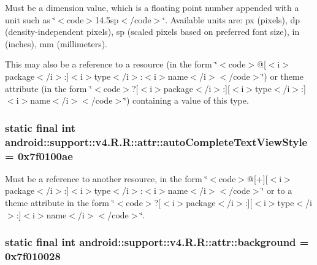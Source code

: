Must be a dimension value, which is a floating point number appended with a unit such as \char`\"{}$<$code$>$14.5sp$<$/code$>$\char`\"{}. Available units are: px (pixels), dp (density-independent pixels), sp (scaled pixels based on preferred font size), in (inches), mm (millimeters). 

This may also be a reference to a resource (in the form \char`\"{}$<$code$>$@\mbox{[}$<$i$>$package$<$/i$>$:\mbox{]}$<$i$>$type$<$/i$>$:$<$i$>$name$<$/i$>$$<$/code$>$\char`\"{}) or theme attribute (in the form \char`\"{}$<$code$>$?\mbox{[}$<$i$>$package$<$/i$>$:\mbox{]}\mbox{[}$<$i$>$type$<$/i$>$:\mbox{]}$<$i$>$name$<$/i$>$$<$/code$>$\char`\"{}) containing a value of this type. \hypertarget{classandroid_1_1support_1_1v4_1_1_r_1_1attr_bcc261aa8274e44785ef92363792c069}{
\subsubsection[{autoCompleteTextViewStyle}]{\setlength{\rightskip}{0pt plus 5cm}static final int android::support::v4.R.R::attr::autoCompleteTextViewStyle = 0x7f0100ae}}
\label{classandroid_1_1support_1_1v4_1_1_r_1_1attr_bcc261aa8274e44785ef92363792c069}


Must be a reference to another resource, in the form \char`\"{}$<$code$>$@\mbox{[}+\mbox{]}\mbox{[}$<$i$>$package$<$/i$>$:\mbox{]}$<$i$>$type$<$/i$>$:$<$i$>$name$<$/i$>$$<$/code$>$\char`\"{} or to a theme attribute in the form \char`\"{}$<$code$>$?\mbox{[}$<$i$>$package$<$/i$>$:\mbox{]}\mbox{[}$<$i$>$type$<$/i$>$:\mbox{]}$<$i$>$name$<$/i$>$$<$/code$>$\char`\"{}. \hypertarget{classandroid_1_1support_1_1v4_1_1_r_1_1attr_8862d5296a9154cb30b8b54d7da3abfd}{
\subsubsection[{background}]{\setlength{\rightskip}{0pt plus 5cm}static final int android::support::v4.R.R::attr::background = 0x7f010028}}
\label{classandroid_1_1support_1_1v4_1_1_r_1_1attr_8862d5296a9154cb30b8b54d7da3abfd}


